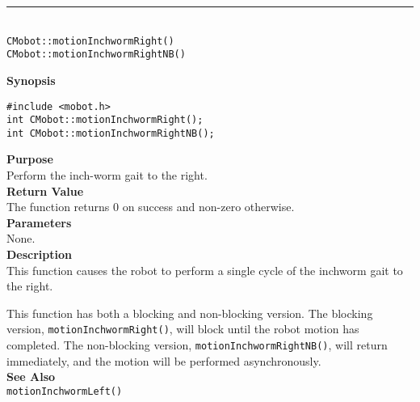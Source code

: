 \noindent
\vspace{5pt}
\rule{4.5in}{0.015in}\\
\noindent
{\LARGE \texttt{CMobot::motionInchwormRight()}}\\
{\LARGE \texttt{CMobot::motionInchwormRightNB()}}\\
{}

\noindent
{\bf Synopsis}\\
\begin{verbatim}
#include <mobot.h>
int CMobot::motionInchwormRight();
int CMobot::motionInchwormRightNB();
\end{verbatim}

\noindent
{\bf Purpose}\\
Perform the inch-worm gait to the right.\\

\noindent
{\bf Return Value}\\
The function returns 0 on success and non-zero otherwise.\\

\noindent
{\bf Parameters}\\
None.\\

\noindent
{\bf Description}\\
This function causes the robot to perform a single cycle of the inchworm gait
to the right. 

This function has both a blocking and non-blocking version.
The blocking version, \texttt{motionInchwormRight()}, will block until the
robot motion has completed. The non-blocking version, \texttt{motionInchwormRightNB()},
will return immediately, and the motion will be performed asynchronously.\\

\noindent
{\bf See Also}\\
\texttt{motionInchwormLeft()}

